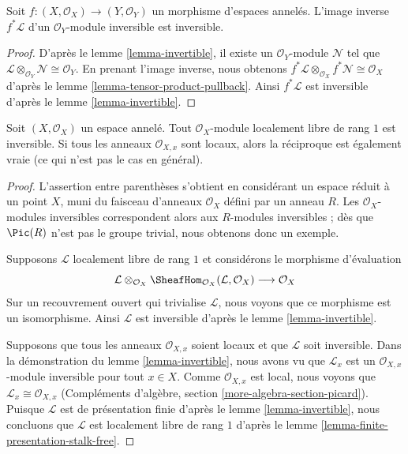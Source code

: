 \begin{lemma}
\label{lemma-pullback-invertible}
Soit $f : (X, \mathcal{O}_X) \to (Y, \mathcal{O}_Y)$ un
morphisme d'espaces annelés. L'image inverse $f^*\mathcal{L}$ d'un
$\mathcal{O}_Y$-module inversible est inversible.
\end{lemma}

\begin{proof}
D'après le lemme \ref{lemma-invertible},
il existe un $\mathcal{O}_Y$-module $\mathcal{N}$ tel que
$\mathcal{L} \otimes_{\mathcal{O}_Y} \mathcal{N} \cong \mathcal{O}_Y$.
En prenant l'image inverse, nous obtenons
$f^*\mathcal{L} \otimes_{\mathcal{O}_X} f^*\mathcal{N} \cong \mathcal{O}_X$
d'après le lemme \ref{lemma-tensor-product-pullback}.
Ainsi $f^*\mathcal{L}$ est inversible d'après le lemme \ref{lemma-invertible}.
\end{proof}

\begin{lemma}
\label{lemma-invertible-is-locally-free-rank-1}
Soit $(X, \mathcal{O}_X)$ un espace annelé. Tout
$\mathcal{O}_X$-module localement libre de rang $1$ est inversible.
Si tous les anneaux $\mathcal{O}_{X, x}$ sont locaux, alors
la réciproque est également vraie (ce qui n'est pas le cas en général).
\end{lemma}

\begin{proof}
L'assertion entre parenthèses s'obtient en considérant un espace réduit à un point
$X$, muni du faisceau d'anneaux $\mathcal{O}_X$ défini par un anneau $R$.
Les $\mathcal{O}_X$-modules inversibles correspondent alors aux
$R$-modules inversibles ; dès que $\Pic(R)$ n'est pas le groupe trivial,
nous obtenons donc un exemple.

\medskip\noindent
Supposons $\mathcal{L}$ localement libre de rang $1$ et considérons le
morphisme d'évaluation
$$
\mathcal{L} \otimes_{\mathcal{O}_X}
\SheafHom_{\mathcal{O}_X}(\mathcal{L}, \mathcal{O}_X)
\longrightarrow \mathcal{O}_X
$$
Sur un recouvrement ouvert qui trivialise $\mathcal{L}$, nous voyons
que ce morphisme est un isomorphisme. Ainsi $\mathcal{L}$ est inversible
d'après le lemme \ref{lemma-invertible}.

\medskip\noindent
Supposons que tous les anneaux $\mathcal{O}_{X, x}$ soient locaux et que $\mathcal{L}$
soit inversible. Dans la démonstration du lemme \ref{lemma-invertible},
nous avons vu que $\mathcal{L}_x$ est un
$\mathcal{O}_{X, x}$-module inversible pour tout $x \in X$. Comme
$\mathcal{O}_{X, x}$ est local, nous voyons que
$\mathcal{L}_x \cong \mathcal{O}_{X, x}$
(Compléments d'algèbre, section \ref{more-algebra-section-picard}).
Puisque $\mathcal{L}$ est de présentation finie d'après le
lemme \ref{lemma-invertible}, nous concluons que $\mathcal{L}$
est localement libre de rang $1$ d'après le
lemme \ref{lemma-finite-presentation-stalk-free}.
\end{proof}

